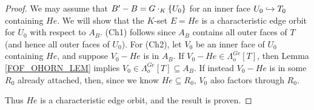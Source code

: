 \documentclass[a4paper,10pt,draft]{article}%
\begin{document}
\begin{proof}
{        We may assume that $B' - B =  G\cdot_K \left\{U_0\right\}$ for an inner face $U_0 \hookrightarrow T_0$
        containing $H e$.
        We will show that the $K$-set $E = H e$ is a characteristic edge orbit for
        $U_0$ with respect to $A_B$.
        (Ch1) follows since $A_B$ contains all outer faces of $T$ (and hence all outer faces of $U_0$).
        For (Ch2), let $V_0$ be an inner face of $U_0$ containing $H e$, 
        and suppose $V_0 - H e$ is in $A_B$.
        If $V_0 - H e \in \Lambda^{G e}_o[T]$, then Lemma \ref{FOF_OHORN_LEM} implies $V_0 \in \Lambda^{G e}_o[T] \subseteq A_B$.
        If instead $V_0 - H e$ is in some $R_0$ already attached, then,
        since we know $H e \subseteq R_0$, 
        $V_0$ also factors through $R_0$.

        Thus $H e$ is a characteristic edge orbit, and the result is proven.
      } %
\end{proof}
\end{document}
